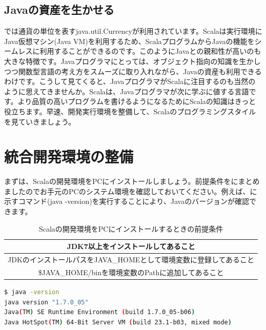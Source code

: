 \subsection*{Javaの資産を生かせる}
では通貨の単位を表すjava.util.Currencyが利用されています。Scalaは実行環境にJava仮想マシン(Java VM)を利用するため、ScalaプログラムからJavaの機能をシームレスに利用することができるのです。このようにJavaとの親和性が高いのも大きな特徴です。Javaプログラマにとっては、オブジェクト指向の知識を生かしつつ関数型言語の考え方をスムーズに取り入れながら、Javaの資産も利用できるわけです。こうして見てくると、JavaプログラマがScalaに注目するのも当然のように思えてきませんか。Scalaは、Javaプログラマが次に学ぶに値する言語です。より品質の高いプログラムを書けるようになるためにScalaの知識はきっと役立ちます。早速、開発実行環境を整備して、Scalaのプログラミングスタイルを見ていきましょう。

\section{統合開発環境の整備}
まずは、Scalaの開発環境をPCにインストールしましょう。前提条件をにまとめましたのでお手元のPCのシステム環境を確認しておいてください。例えば、に示すコマンド(java -version)を実行することにより、Javaのバージョンが確認できます。

\begin{table}[htb]
  \caption{Scalaの開発環境をPCにインストールするときの前提条件}
  \begin{center}
    \begin{tabular}{|c|} \hline
      JDK7以上をインストールしてあること\\ \hline
      JDKのインストールパスをJAVA\_HOMEとして環境変数に登録してあること\\ \hline
      \$JAVA\_HOME/binを環境変数のPathに追加してあること\\ \hline
    \end{tabular}
  \end{center}
  \label{tb:scala_pre_conditions}
\end{table}

\begin{lstlisting}[language=bash, frame=none, label=cmd:java_version, caption=Javaのバージョンを確認する方法]
$ java -version
java version "1.7.0_05"
Java(TM) SE Runtime Environment (build 1.7.0_05-b06)
Java HotSpot(TM) 64-Bit Server VM (build 23.1-b03, mixed mode)
\end{lstlisting}

